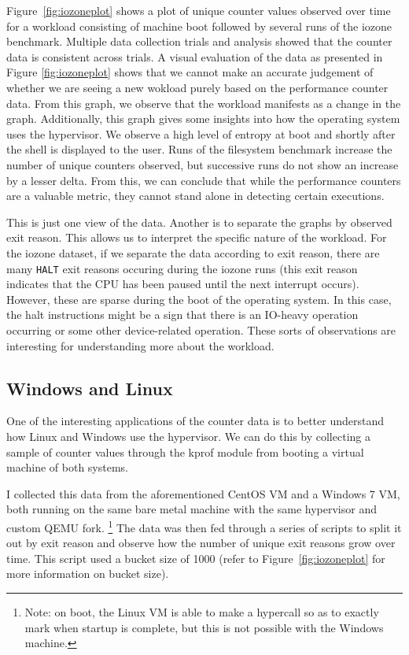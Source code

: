 \documentclass[notitlepage]{article}
\begin{document}
Figure~\ref{fig:iozoneplot} shows a plot of unique counter values observed over
time for a workload consisting of machine boot followed by several runs of the
iozone benchmark. Multiple data collection trials and analysis showed that the
counter data is consistent across trials. A visual evaluation of the data as
presented in Figure \ref{fig:iozoneplot} shows that we cannot make an accurate
judgement of whether we are seeing a new wokload purely based on the performance
counter data. From this graph, we observe that the workload manifests as a
change in the graph.  Additionally, this graph gives some insights into how the
operating system uses the hypervisor. We observe a high level of entropy at boot
and shortly after the shell is displayed to the user. Runs of the filesystem
benchmark increase the number of unique counters observed, but successive runs
do not show an increase by a lesser delta. From this, we can conclude that while
the performance counters are a valuable metric, they cannot stand alone in
detecting certain executions.

This is just one view of the data. Another is to separate the graphs by observed
exit reason. This allows us to interpret the specific nature of the workload.
For the iozone dataset, if we separate the data according to exit reason, there
are many \texttt{HALT} exit reasons occuring during the iozone runs (this exit
reason indicates that the CPU has been paused until the next interrupt occurs).
However, these are sparse during the boot of the operating system. In this case,
the halt instructions might be a sign that there is an IO-heavy operation
occurring or some other device-related operation. These sorts of observations
are interesting for understanding more about the workload.

\subsection{Windows and Linux}
One of the interesting applications of the counter data is to better understand
how Linux and Windows use the hypervisor. We can do this by collecting a sample
of counter values through the kprof module from booting a virtual machine of
both systems.

I collected this data from the aforementioned CentOS VM and a Windows 7 VM, both
running on the same bare metal machine with the same hypervisor and custom QEMU
fork. \footnote{Note: on boot, the Linux VM is able to make a hypercall so as to
    exactly mark when startup is complete, but this is not possible with the
Windows machine.} The data was then fed through a series of scripts to split it
out by exit reason and observe how the number of unique exit reasons grow over
time. This script used a bucket size of 1000 (refer to
Figure~\ref{fig:iozoneplot} for more information on bucket size).
\end{document}
